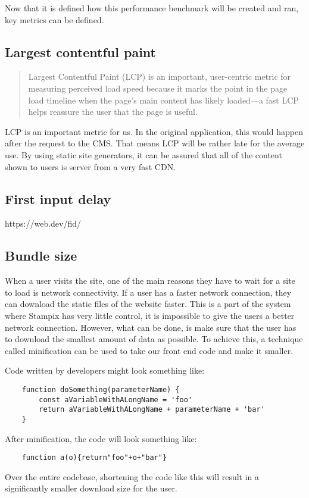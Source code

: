 Now that it is defined how this performance benchmark will be created and ran, key metrics can be defined.

\subsection{Largest contentful paint}

\begin{quote}
	Largest Contentful Paint (LCP) is an important, user-centric metric for measuring perceived load speed because it marks the point in the page load timeline when the page's main content has likely loaded—a fast LCP helps reassure the user that the page is useful.
	\hfill \cite{webvitalswebsite}
\end{quote}

LCP is an important metric for us. In the original application, this would happen after the request to the CMS. 
That means LCP will be rather late for the average use.
By using static site generators, it can be assured that all of the content shown to users is server from a very fast CDN. 

\subsection{First input delay}

https://web.dev/fid/


\subsection{Bundle size}

When a user visits the site, one of the main reasons they have to wait for a site to load is network connectivity. 
If a user has a faster network connection, they can download the static files of the website faster.
This is a part of the system where Stampix has very little control, it is impossible to give the users a better network connection. 
However, what can be done, is make sure that the user has to download the smallest amount of data as possible. 
To achieve this, a technique called minification can be used to take our front end code and make it smaller.

Code written by developers might look something like:

\begin{verbatim}
    function doSomething(parameterName) {
        const aVariableWithALongName = 'foo'
        return aVariableWithALongName + parameterName + 'bar'
    }
\end{verbatim}

After minification, the code will look something like:

\begin{verbatim}
    function a(o){return"foo"+o+"bar"}
\end{verbatim}

Over the entire codebase, shortening the code like this will result in a significantly smaller download size for the user.
